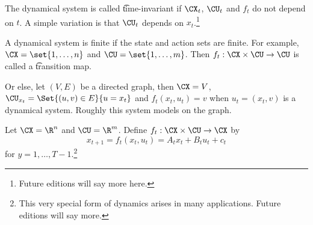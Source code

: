 The dynamical system is called \t{time-invariant} if $\CX_{t}$, $\CU_t$ and $f_t$ do not depend on $t$.
A simple variation is that $\CU_t$ depends on $x_t$.\footnote{Future editions will say more here.}



A dynamical system is finite if the state and action sets are finite.
For example, $\CX = \set{1, \dots, n}$ and $\CU = \set{1, \dots, m}$.
Then $f_t: \CX \times \CU \to \CU$ is called a \t{transition map}.

Or else, let $(V, E)$ be a directed graph, then $\CX = V$, $\CU_{x_t} = \Set{(u, v) \in E}{u = x_t}$ and $f_t(x_t, u_t) = v$ when $u_t = (x_t, v)$ is a dynamical system.
Roughly this system models  on the graph.


Let $\CX = \R^n$ and $\CU = \R^m$.
Define $f_t: \CX \times \CU \to \CX$ by
\[
    x_{t+1} = f_t(x_t, u_t) = A_t x_t + B_t u_t + c_t
\]
for $y = 1, \dots, T-1$.\footnote{This very special form of dynamics arises in many applications. Future editions will say more.}

